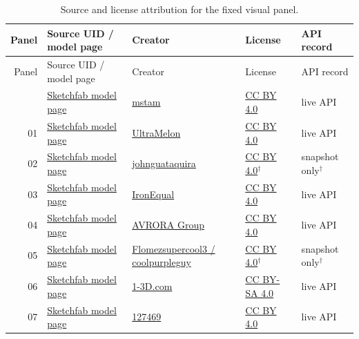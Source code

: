 \begin{longtable}{r p{3.4cm} p{4.3cm} p{2.7cm} p{2.0cm}}
\caption{Source and license attribution for the fixed visual panel.}\\
\toprule
Panel & Source UID / model page & Creator & License & API record \\
\midrule
\endfirsthead
\toprule
Panel & Source UID / model page & Creator & License & API record \\
\midrule
\endhead
\bottomrule
\endfoot
00 & \href{https://sketchfab.com/3d-models/00002bcb84af4a4781174e62619f14e2}{Sketchfab model page} & \href{https://sketchfab.com/mstam}{mstam} & \href{https://creativecommons.org/licenses/by/4.0/}{CC BY 4.0} & live API \\
01 & \href{https://sketchfab.com/3d-models/001a6a0890844d8baa564a347548945d}{Sketchfab model page} & \href{https://sketchfab.com/UltraMelon}{UltraMelon} & \href{https://creativecommons.org/licenses/by/4.0/}{CC BY 4.0} & live API \\
02 & \href{https://sketchfab.com/3d-models/001cfadfb9204424bccc45501ce6b90e}{Sketchfab model page} & \href{https://sketchfab.com/johnguataquira}{johnguataquira} & \href{https://creativecommons.org/licenses/by/4.0/}{CC BY 4.0$^{\dagger}$} & snapshot only$^{\dagger}$ \\
03 & \href{https://sketchfab.com/3d-models/001dd2c17b1443aab500f61634bc3b89}{Sketchfab model page} & \href{https://sketchfab.com/ie-niels}{IronEqual} & \href{https://creativecommons.org/licenses/by/4.0/}{CC BY 4.0} & live API \\
04 & \href{https://sketchfab.com/3d-models/0045e87262664927a3298f2ed0f640c1}{Sketchfab model page} & \href{https://sketchfab.com/avroralepnina}{AVRORA Group} & \href{https://creativecommons.org/licenses/by/4.0/}{CC BY 4.0} & live API \\
05 & \href{https://sketchfab.com/3d-models/00820c449b8c4c84b3ae58d3d168ca7b}{Sketchfab model page} & \href{https://sketchfab.com/flomezsupercool}{Flomezsupercool3 / coolpurpleguy} & \href{https://creativecommons.org/licenses/by/4.0/}{CC BY 4.0$^{\dagger}$} & snapshot only$^{\dagger}$ \\
06 & \href{https://sketchfab.com/3d-models/008a72f0e6be408cbf90c81966789547}{Sketchfab model page} & \href{https://sketchfab.com/1-3D.com}{1-3D.com} & \href{https://creativecommons.org/licenses/by-sa/4.0/}{CC BY-SA 4.0} & live API \\
07 & \href{https://sketchfab.com/3d-models/0099ab6d44b742b0b62a40a7c70c29b1}{Sketchfab model page} & \href{https://sketchfab.com/127469}{127469} & \href{https://creativecommons.org/licenses/by/4.0/}{CC BY 4.0} & live API \\

\end{longtable}
